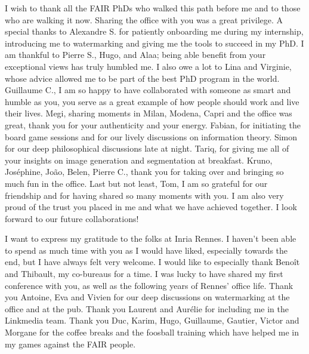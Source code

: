 I wish to thank all the FAIR PhDs who walked this path before me and to those who are walking it now. 
Sharing the office with you was a great privilege.
A special thanks to Alexandre S. for patiently onboarding me during my internship, introducing me to watermarking and giving me the tools to succeed in my PhD.
I am thankful to Pierre S., Hugo, and Alaa; being able benefit from your exceptional views has truly humbled me.
I also owe a lot to Lina and Virginie, whose advice allowed me to be part of the best PhD program in the world.
Guillaume C., I am so happy to have collaborated with someone as smart and humble as you, you serve as a great example of how people should work and live their lives.
Megi, sharing moments in Milan, Modena, Capri and the office was great, thank you for your authenticity and your energy.
Fabian, for initiating the board game sessions and for our lively discussions on information theory.
Simon for our deep philosophical discussions late at night.
Tariq, for giving me all of your insights on image generation and segmentation at breakfast.
Kruno, Jos\'ephine, Jo\~ao, Belen, Pierre C., thank you for taking over and bringing so much fun in the office.
Last but not least, Tom, I am so grateful for our friendship and for having shared so many moments with you.
I am also very proud of the trust you placed in me and what we have achieved together. 
I look forward to our future collaborations!

I want to express my gratitude to the folks at Inria Rennes. 
I haven't been able to spend as much time with you as I would have liked, especially towards the end, but I have always felt very welcome.
I would like to especially thank Benoît and Thibault, my co-bureaus for a time.
I was lucky to have shared my first conference with you, as well as the following years of Rennes' office life.
Thank you Antoine, Eva and Vivien for our deep discussions on watermarking at the office and at the pub.
Thank you Laurent and Aur\'elie for including me in the Linkmedia team.
Thank you Duc, Karim, Hugo, Guillaume, Gautier, Victor and Morgane for the coffee breaks and the foosball training which have helped me in my games against the FAIR people.

